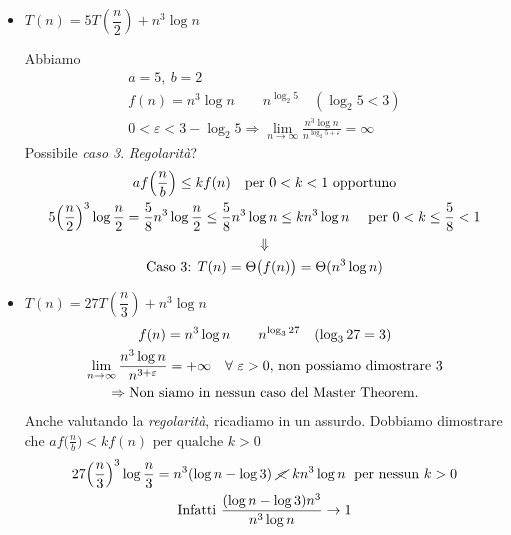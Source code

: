 \begin{itemize}[label=$\bullet$]
    \item $T(n) = 5T(\dfrac{n}{2}) + n^3 \log n$ \par
    Abbiamo 
    \begin{gather*}
        a = 5, \ b = 2 \\
        f(n) = n^3 \log n \qquad n^{\log_2 5} \quad (\log_2 5 < 3) \\
        0 < \varepsilon < 3 - \log_2 5 \Rightarrow
            \lim_{n \to \infty} \frac{n^3 \log n}{n^{\log_2 5 + \varepsilon}} = \infty
    \end{gather*}
    Possibile \emph{caso 3}. \emph{Regolarità}?
    \begin{gather*}
        af\Big(\frac{n}{b}\Big) \leq kf(n) \quad \text{per } 0 < k < 1 \text{ opportuno} \\
        5 \Big(\frac{n}{2}\Big)^3 \log \frac{n}{2} = \frac{5}{8}n^3 \log \frac{n}{2} 
            \leq \frac{5}{8} n^3 \log n \leq kn^3 \log n \quad \text{ per } 0 < k \leq \frac{5}{8} < 1 \\
            \Downarrow \\
            \text{\emph{Caso 3}: } T(n) = \Theta \big(f(n)\big) = \Theta(n^3 \log n)
    \end{gather*}

    \item $T(n) = 27T(\dfrac{n}{3}) + n^3 \log n$ 
    \begin{gather*}
        f(n) = n^3 \log n \qquad n^{\log_3 27} \quad (\log_3 27 = 3) \\
        \lim_{n \to \infty} \frac{n^3 \log n}{n^{3 + \varepsilon}} = +\infty \quad \forall \varepsilon > 0 
            \text{, non possiamo dimostrare 3}\\
        \Rightarrow \text{Non siamo in \emph{nessun} caso del Master Theorem.}
    \end{gather*}
    Anche valutando la \emph{regolarità}, ricadiamo in un assurdo. Dobbiamo dimostrare che
    $af \big( \frac{n}{b} \big) < kf(n) \text{ per qualche } k > 0$
    \begin{gather*}
        27 \Big( \frac{n}{3} \Big)^3 \log \frac{n}{3} = n^3(\log n - \log 3) \ \cancel{<} \ k n^3 \log n \; \text{ per nessun } k > 0\\
        \text{Infatti } \frac{(\log n - \log 3)n^3}{n^3 \log n} \rightarrow 1
    \end{gather*}


\end{itemize}
